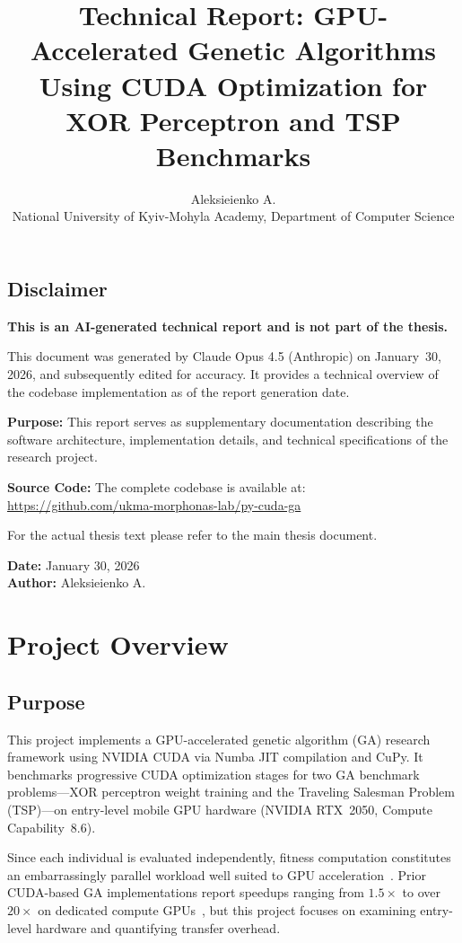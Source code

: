 \documentclass[a4paper,14pt]{extarticle}
\title{Technical Report: GPU-Accelerated Genetic Algorithms\\Using CUDA Optimization for XOR Perceptron and TSP Benchmarks}
\author{Aleksieienko A.\\
{\small National University of Kyiv-Mohyla Academy, Department of Computer Science}}
\date{}
\begin{document}
\ifdefined\reportcomposed\else
\maketitle
\thispagestyle{empty}
\fi

\subsection*{Disclaimer}

\textbf{This is an AI-generated technical report and is not part of the thesis.}

This document was generated by Claude Opus 4.5 (Anthropic) on January~30,
2026, and subsequently edited for accuracy. It provides a technical overview of the codebase
implementation as of the report generation date.

\textbf{Purpose:} This report serves as supplementary documentation describing the software
architecture, implementation details, and technical specifications of the research project.

\textbf{Source Code:} The complete codebase is available at:\\
\url{https://github.com/ukma-morphonas-lab/py-cuda-ga}

For the actual thesis text please refer to the main thesis document.

\textbf{Date:} January 30, 2026\\
\textbf{Author:} Aleksieienko A.


\section{Project Overview}

\subsection{Purpose}

This project implements a GPU-accelerated genetic algorithm (GA) research framework using
NVIDIA CUDA via Numba JIT compilation and CuPy. It benchmarks progressive CUDA optimization
stages for two GA benchmark problems---XOR perceptron weight training and the Traveling
Salesman Problem (TSP)---on entry-level mobile GPU hardware (NVIDIA RTX~2050, Compute
Capability~8.6).

Since each individual is evaluated independently, fitness computation constitutes an
embarrassingly parallel workload well suited to GPU acceleration~\cite{cheng2020parallel}.
Prior CUDA-based GA implementations report speedups ranging from $1.5\times$ to over
$20\times$ on dedicated compute GPUs~\cite{plichta2014implementation}, but this project
focuses on examining entry-level hardware and quantifying transfer overhead.
\end{document}
